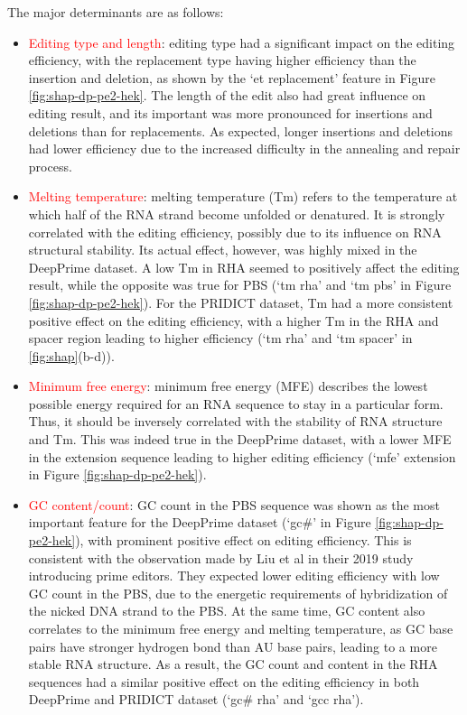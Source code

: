 The major determinants are as follows:
\begin{itemize}[itemsep=-0mm]
    \item \textcolor{red}{Editing type and length}: editing type had a significant impact on the editing efficiency, with the replacement type having higher efficiency than the insertion and deletion, as shown by the `et replacement' feature in Figure \ref{fig:shap-dp-pe2-hek}. The length of the edit also had great influence on editing result, and its important was more pronounced for insertions and deletions than for replacements. As expected, longer insertions and deletions had lower efficiency due to the increased difficulty in the annealing and repair process.
    \item \textcolor{red}{Melting temperature}: melting temperature (Tm) refers to the temperature at which half of the RNA strand become unfolded or denatured. It is strongly correlated with the editing efficiency, possibly due to its influence on RNA structural stability. Its actual effect, however, was highly mixed in the DeepPrime dataset. A low Tm in RHA seemed to positively affect the editing result, while the opposite was true for PBS (`tm rha' and `tm pbs' in Figure \ref{fig:shap-dp-pe2-hek}). For the PRIDICT dataset, Tm had a more consistent positive effect on the editing efficiency, with a higher Tm in the RHA and spacer region leading to higher efficiency (`tm rha' and `tm spacer' in \autoref{fig:shap}(b-d)).
    \item \textcolor{red}{Minimum free energy}: minimum free energy (MFE) describes the lowest possible energy required for an RNA sequence to stay in a particular form\cite{lorenzViennaRNAPackage2011}. Thus, it should be inversely correlated with the stability of RNA structure and Tm. This was indeed true in the DeepPrime dataset, with a lower MFE in the extension sequence leading to higher editing efficiency (`mfe' extension in Figure \ref{fig:shap-dp-pe2-hek}). 
    \item \textcolor{red}{GC content/count}: GC count in the PBS sequence was shown as the most important feature for the DeepPrime dataset (`gc\#' in Figure \ref{fig:shap-dp-pe2-hek}), with prominent positive effect on editing efficiency. This is consistent with the observation made by Liu et al in their 2019 study introducing prime editors. They expected lower editing efficiency with low GC count in the PBS, due to the energetic requirements of hybridization of the nicked DNA strand to the PBS\cite{liudavidr.SearchandreplaceGenomeEditing2019}. At the same time, GC content also correlates to the minimum free energy and melting temperature, as GC base pairs have stronger hydrogen bond than AU base pairs, leading to a more stable RNA structure\cite{kimPredictingEfficiencyPrime2021}. As a result, the GC count and content in the RHA sequences had a similar positive effect on the editing efficiency in both DeepPrime and PRIDICT dataset (`gc\# rha' and `gcc rha'). 

\end{itemize}
